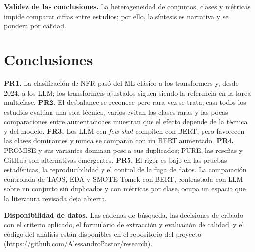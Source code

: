 \documentclass[conference]{IEEEtran}
\begin{document}
\textbf{Validez de las conclusiones.} La heterogeneidad de conjuntos, clases y métricas impide comparar cifras entre estudios; por ello, la síntesis es narrativa y se pondera por calidad.

\section{Conclusiones}\label{sec:conclusiones}
\textbf{PR1.} La clasificación de NFR pasó del ML clásico a los transformers y, desde 2024, a los LLM; los transformers ajustados siguen siendo la referencia en la tarea multiclase. \textbf{PR2.} El desbalance se reconoce pero rara vez se trata; casi todos los estudios evalúan una sola técnica, varios evitan las clases raras y las pocas comparaciones entre aumentaciones muestran que el efecto depende de la técnica y del modelo. \textbf{PR3.} Los LLM con \emph{few-shot} compiten con BERT, pero favorecen las clases dominantes y nunca se comparan con un BERT aumentado. \textbf{PR4.} PROMISE y sus variantes dominan pese a sus duplicados; PURE, las reseñas y GitHub son alternativas emergentes. \textbf{PR5.} El rigor es bajo en las pruebas estadísticas, la reproducibilidad y el control de la fuga de datos. La comparación controlada de TAOS, EDA y SMOTE-Tomek con BERT, contrastada con LLM sobre un conjunto sin duplicados y con métricas por clase, ocupa un espacio que la literatura revisada deja abierto.

\textbf{Disponibilidad de datos.} Las cadenas de búsqueda, las decisiones de cribado con el criterio aplicado, el formulario de extracción y evaluación de calidad, y el código del análisis están disponibles en el repositorio del proyecto (\url{https://github.com/AlessandroPastor/research}).




\onecolumn
\appendix

\end{document}
